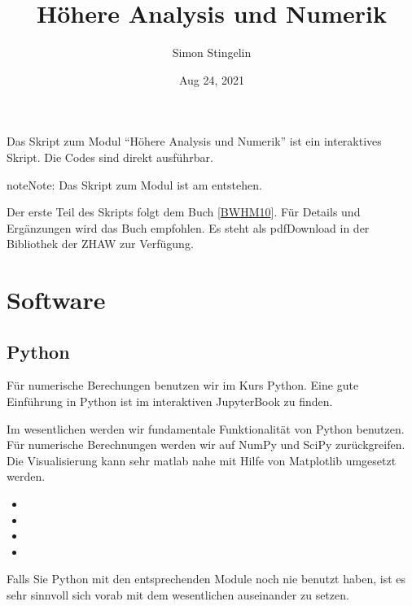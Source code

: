 \documentclass[letterpaper,10pt,english]{jupyterBook}
\title{Höhere Analysis und Numerik}
\date{Aug 24, 2021}
\author{Simon Stingelin}
\begin{document}
\pagestyle{empty}
\sphinxmaketitle
\pagestyle{plain}
\sphinxtableofcontents
\pagestyle{normal}
\label{\detokenize{intro::doc}}


Das Skript zum Modul “Höhere Analysis und Numerik” ist ein interaktives Skript. Die Codes sind direkt ausführbar.

\begin{sphinxadmonition}{note}{Note:}
Das Skript zum Modul ist am entstehen.
\end{sphinxadmonition}

Der erste Teil des Skripts folgt dem Buch {[}\hyperlink{cite.Appendix:id2}{BWHM10}{]}. Für Details und Ergänzungen wird das Buch empfohlen. Es steht als pdf\sphinxhyphen{}Download in der Bibliothek der ZHAW zur Verfügung.


\part{Software}


\chapter{Python}
\label{\detokenize{Software/Python:python}}\label{\detokenize{Software/Python::doc}}
Für numerische Berechungen benutzen wir im Kurs Python. Eine gute Einführung in Python ist im interaktiven Jupyter\sphinxhyphen{}Book  zu finden.

Im wesentlichen werden wir fundamentale Funktionalität von Python benutzen. Für numerische Berechnungen werden wir auf NumPy und SciPy zurückgreifen. Die Visualisierung kann sehr matlab nahe mit Hilfe von Matplotlib umgesetzt werden.
\begin{itemize}
\item {} 

\item {} 

\item {} 

\item {} 

\end{itemize}

Falls Sie Python mit den entsprechenden Module noch nie benutzt haben, ist es sehr sinnvoll sich vorab mit dem wesentlichen auseinander zu setzen.
\end{document}
